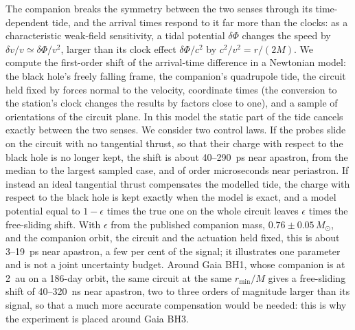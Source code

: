 \documentclass[12pt]{iopart}
\theoremstyle{plain}
\theoremstyle{definition}
\theoremstyle{remark}
\begin{document}
The companion breaks the symmetry between the two senses through its time-dependent tide,
and the arrival times respond to it far more than the clocks: as a characteristic
weak-field sensitivity, a tidal potential $\delta\Phi$ changes the speed by
$\delta v/v\simeq\delta\Phi/v^2$, larger than its clock effect $\delta\Phi/c^2$ by
$c^2/v^2=r/(2M)$. We compute the first-order shift of the arrival-time difference in a
Newtonian model: the black hole's freely falling frame, the companion's quadrupole tide, the
circuit held fixed by forces normal to the velocity, coordinate times (the conversion to the
station's clock changes the results by factors close to one), and a sample of orientations of
the circuit plane. In this model the static part of the tide cancels exactly between the two
senses. We consider two control laws. If the probes slide on the circuit with no tangential
thrust, so that their charge with respect to the black hole is no longer kept, the shift is about 40--290~ps near apastron, from the
median to the largest sampled case, and of order microseconds near periastron. If instead
an ideal tangential thrust compensates the modelled tide, the charge with respect to the black
hole is kept exactly when the model is exact, and a model potential equal to $1-\epsilon$ times
the true one on the whole circuit leaves $\epsilon$ times the free-sliding shift. With
$\epsilon$ from the published companion mass, $0.76\pm0.05\,M_\odot$, and the companion
orbit, the circuit and the actuation held fixed, this is about 3--19~ps near apastron, a few
per cent of the signal; it illustrates one parameter and is not a joint uncertainty budget.
Around Gaia BH1, whose companion is at 2~au on a 186-day orbit, the same circuit at the same
$r_{\min}/M$ gives a free-sliding shift of 40--320~ns near apastron, two to three orders of
magnitude larger than its signal, so that a much more accurate compensation would be needed:
this is why the experiment is placed around Gaia BH3.
\end{document}
